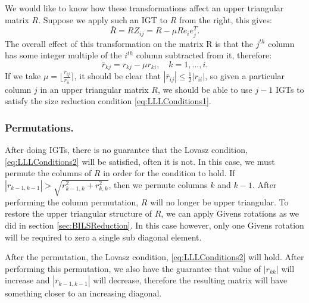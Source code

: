 \documentclass[12pt,Bold,letterpaper]{mcgilletdclass}
\newcommand{\vsp}{\vspace{\baselineskip}}
\begin{document}
We would like to know how these transformations affect an upper triangular matrix $R$. Suppose we apply such an IGT to $R$ from the right, this gives:
\begin{equation}
\bar{R} = RZ_{ij} = R - \mu Re_ie_j^T.
\end{equation}
The overall effect of this transformation on the matrix R is that the $j^{th}$ column has some integer multiple of the $i^{th}$ column subtracted from it, therefore:
\begin{equation}
\bar{r}_{kj} = r_{kj} - \mu r_{ki}, \quad k=1 , \dots, i.
\end{equation}
If we take $\mu = \lfloor \frac{r_{ij}}{r_{ii}} \rceil$, it should be clear that
$|\bar{r}_{ij}| \le \frac{1}{2}|r_{ii}|$, so given a particular column $j$ in an
upper triangular matrix $R$, we should be able to use $j-1$ IGTs to satisfy the
size reduction condition \eqref{eq:LLLConditions1}.

\vsp \subsubsection{Permutations.} \label{subsec:Perm}
After doing IGTs, there is no guarantee that the Lovasz condition,
\eqref{eq:LLLConditions2} will be satisfied, often it is not. In this case, we
must permute the columns of $R$ in order for the condition to hold. If
$|r_{k-1,k-1}| > \sqrt{r^2_{k-1,k} + r^2_{k,k}}$, then we permute columns
$k$ and $k-1$. After performing the column permutation, $R$ will no longer be
upper triangular. To restore the upper triangular structure of $R$, we can apply
Givens rotations as we did in section \ref{sec:BILSReduction}. In this case
however, only one Givens rotation will be required to zero a single sub diagonal
element.

After the permutation, the Lovasz condition, \eqref{eq:LLLConditions2} will
hold. After performing this permutation, we also have the guarantee that value
of $|r_{kk}|$ will increase and $|r_{k-1,k-1}|$ will decrease, therefore the
resulting matrix will have something closer to an increasing diagonal.
\end{document}
